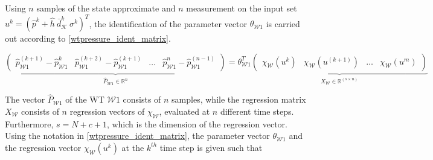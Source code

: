 \vspace{-3mm}

Using $n$ samples of the state approximate and $n$ measurement on the input set $u^k = ( \hat{p}^{k}\! + \!\hat{h} \ \bar{d}^{k}_{\mathcal{K}} \ \sigma^{k} )^T$, the identification of the parameter vector $\theta_{\mathcal{W}1}$ is carried out according to \eqref{wtpressure_ident_matrix}. 

  \begin{equation}
\label{wtpressure_ident_matrix}
\underbrace{\begin{pmatrix}
           \! \hat{p}^{(\!k+1\!)}_{\! \mathcal{W}1} \!-\! \hat{p}^{k}_{\!\mathcal{W}1} & \hat{p}^{(\!k+2\!)}_{\! \mathcal{W}1} \!-\! \hat{p}^{(\!k+1\!)}_{\!\mathcal{W}1}\! & \!\hdots \! & \!\hat{p}^{n}_{\! \mathcal{W}1} \!-\! \hat{p}^{(\!n-1\!)}_{\!\mathcal{W}1}\!
         \end{pmatrix}}_{\hat{P}_{\mathcal{W}1}  \in  \mathbb{R}^{n}} 
         \!=\! \theta^T_{\mathcal{W}1} \!   
         \underbrace{\!\begin{pmatrix}
           \! \chi_{\mathcal{W}}(u^{k}) & \chi_{\mathcal{W}}(u^{(k+1)})\! & \!\hdots\! &\! \chi_{\mathcal{W}}(u^{m})\!
         \end{pmatrix}}_{X_{\mathcal{W}} \in \mathbb{R}^{(s \times n)}}
\end{equation}

The vector $\hat{P}_{\mathcal{W}1}$ of the WT $\mathcal{W}1$ consists of $n$ samples, while the regression matrix $X_{\mathcal{W}}$ consists of $n$ regression vectors of $\chi_{\mathcal{W}}$, evaluated at $n$ different time steps. Furthermore, $s = N \!+\! c \! + \!1$, which is the dimension of the regression vector. Using the notation in \eqref{wtpressure_ident_matrix}, the parameter vector $\theta_{\mathcal{W}1}$ and the regression vector $\chi_{\mathcal{W}}(u^k)$ at the $k^{th}$ time step is given such that


